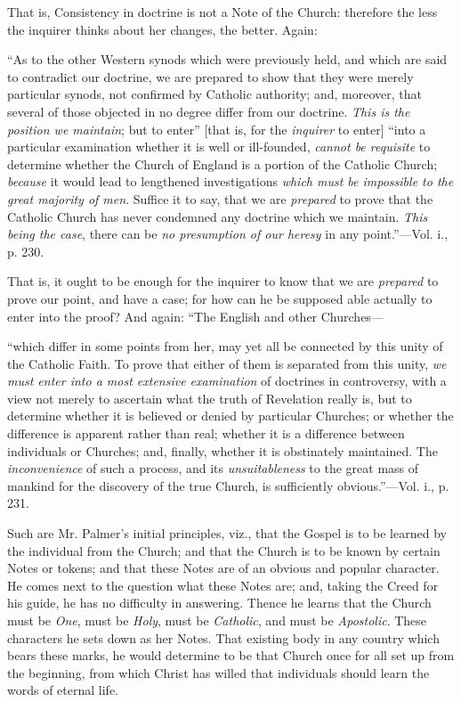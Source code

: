 That is, Consistency in doctrine is not a Note of
the Church: therefore the less the inquirer thinks about her changes,
the better. Again:

``As
to the other Western synods which were previously held, and which are
said to contradict our doctrine, we are prepared to show that they
were merely particular synods, not confirmed by Catholic authority;
and, moreover, that several of those objected in no degree differ from
our doctrine. \emph{This is the position we maintain}; but to enter''
[that is, for the \emph{inquirer} to enter] ``into a particular
examination whether it is well or ill-founded, \emph{cannot be requisite}
to determine whether the Church of England is a portion of the
Catholic Church; \emph{because} it would lead to lengthened
investigations \emph{which must be impossible to the great majority of
men}. Suffice it to say, that we are \emph{prepared} to prove that
the Catholic Church has never condemned any doctrine which we
maintain. \emph{This being the case}, there can be \emph{no presumption
of our heresy} in any point.''—Vol. i., p. 230.

That is, it ought to be enough for the inquirer
to know that we are \emph{prepared} to prove our point, and have a
case; for how can he be supposed able actually to enter into the
proof? And again: ``The English and other Churches—

``which
differ in some points from her, may yet all be connected by this unity
of the Catholic Faith. To prove that either of them is separated from
this unity, \emph{we must enter into a most extensive examination} of
doctrines in controversy, with a view not merely to ascertain what the
truth of Revelation really is, but to determine whether it is believed
or denied by particular Churches; or whether the difference is
apparent rather than real; whether it is a difference between
individuals or Churches; and, finally, whether it is obstinately
maintained. The \emph{inconvenience} of such a process, and its \emph{unsuitableness}
to the great mass of mankind for the discovery of the true Church, is
sufficiently obvious.''—Vol. i., p. 231.

Such are Mr. Palmer's initial principles, viz.,
that the Gospel is to be learned by the individual from the Church;
and that the Church is to be known by certain Notes or tokens; and
that these Notes are of an obvious and popular character. He comes
next to the question what these Notes are; and, taking the Creed for
his guide, he has no difficulty in answering. Thence he learns that
the Church must be \emph{One}, must be \emph{Holy}, must be \emph{Catholic},
and must be \emph{Apostolic}. These characters he sets down as her
Notes. That existing body in any country which bears these marks, he
would determine to be that Church once for all set up from the
beginning, from which Christ has willed that individuals should learn
the words of eternal life.

